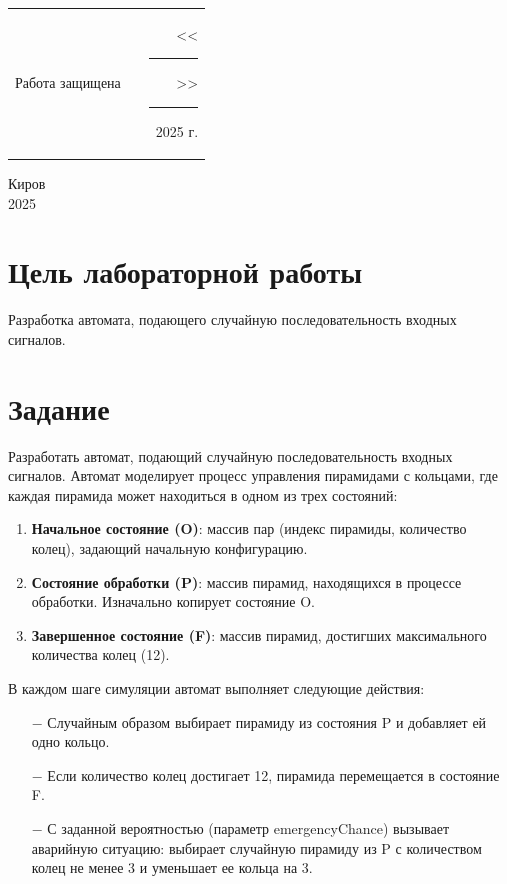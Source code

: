 \documentclass[oneside,a4paper,14pt]{extarticle}
\begin{document}
\noindent
\begin{tabular}{lp{58mm}r}
  Работа защищена &  & \hspace{13mm}<<\rule[-1mm]{5mm}{0.10mm}\/>>\rule[-1mm]{30mm}{0.10mm}\ 2025 г.
\end{tabular}
\vfill

\begin{center}
  Киров\\
  2025
\end{center}

\newpage\thispagestyle{plain}

\section*{Цель лабораторной работы}
Разработка автомата, подающего случайную последовательность входных сигналов.

\section*{Задание}
Разработать автомат, подающий случайную последовательность входных сигналов. Автомат моделирует процесс управления пирамидами с кольцами, где каждая пирамида может находиться в одном из трех состояний:

\begin{enumerate}
  \item \textbf{Начальное состояние (O)}: массив пар (индекс пирамиды, количество колец), задающий начальную конфигурацию.
  \item \textbf{Состояние обработки (P)}: массив пирамид, находящихся в процессе обработки. Изначально копирует состояние O.
  \item \textbf{Завершенное состояние (F)}: массив пирамид, достигших максимального количества колец (12).
\end{enumerate}

\noindent В каждом шаге симуляции автомат выполняет следующие действия:
\begin{itemize}
  \item[$-$] Случайным образом выбирает пирамиду из состояния P и добавляет ей одно кольцо.
  \item[$-$] Если количество колец достигает 12, пирамида перемещается в состояние F.
  \item[$-$] С заданной вероятностью (параметр emergencyChance) вызывает аварийную ситуацию: выбирает случайную пирамиду из P с количеством колец не менее 3 и уменьшает ее кольца на 3.
\end{itemize}
\end{document}
